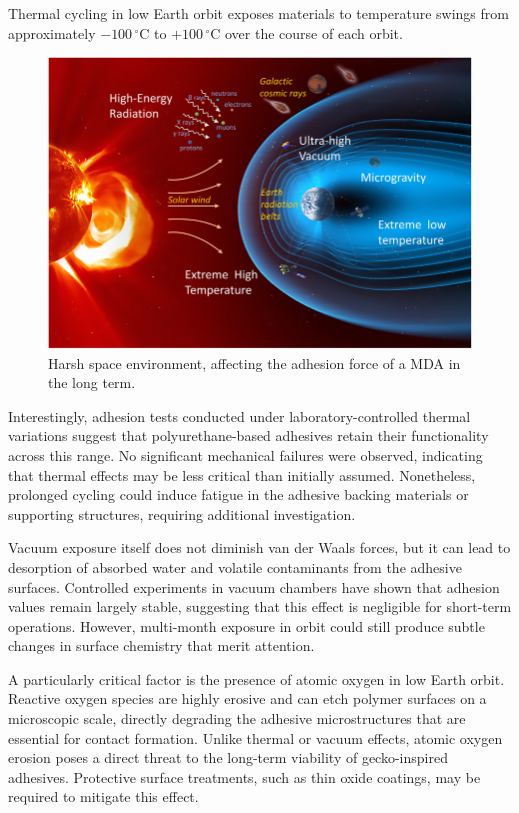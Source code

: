 \documentclass[
    twocolumn,
    fontsize = 10pt,
    parskip = half+,
    headings = small,
    headwidth = text,
    footwidth = text,
]{scrartcl}
\begin{document}
Thermal cycling in low Earth orbit exposes materials to temperature swings from approximately $-100\,^{\circ}$C to $+100\,^{\circ}$C 
over the course of each orbit. 


\begin{figure}[h!]
    \centering
    \includegraphics[width=0.7\linewidth]{pics/spaceenv.png}
    \caption{Harsh space environment, affecting the adhesion force of a MDA in the long term.}
    \label{fig:spaceenv}
\end{figure}

Interestingly, adhesion tests conducted under laboratory-controlled thermal variations suggest that 
polyurethane-based adhesives retain their functionality across this range. 
No significant mechanical failures were observed, 
indicating that thermal effects may be less critical than initially assumed. 
Nonetheless, prolonged cycling could induce fatigue in the adhesive backing materials or supporting structures, 
requiring additional investigation.  

Vacuum exposure itself does not diminish van der Waals forces, 
but it can lead to desorption of absorbed water and volatile contaminants from the adhesive surfaces. 
Controlled experiments in vacuum chambers have shown that adhesion values remain largely stable, 
suggesting that this effect is negligible for short-term operations. 
However, multi-month exposure in orbit could still produce subtle changes in surface chemistry that merit attention.  

A particularly critical factor is the presence of atomic oxygen in low Earth orbit. 
Reactive oxygen species are highly erosive and can etch polymer surfaces on a microscopic scale, 
directly degrading the adhesive microstructures that are essential for contact formation. 
Unlike thermal or vacuum effects, atomic oxygen erosion poses a direct threat to the long-term viability of gecko-inspired adhesives. 
Protective surface treatments, such as thin oxide coatings, may be required to mitigate this effect.  
\end{document}
